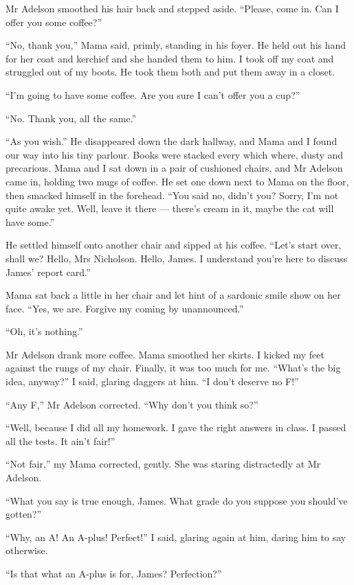 Mr Adelson smoothed his hair back and stepped aside.
``Please, come in. Can I offer you some coffee?''

``No, thank you,'' Mama said, primly, standing in his foyer. He
held out his hand for her coat and kerchief and she handed them to
him. I took off my coat and struggled out of my boots. He took them
both and put them away in a closet.

``I'm going to have some coffee. Are you sure I can't offer you a cup?''

``No. Thank you, all the same.''

``As you wish.'' He disappeared down the dark hallway, and Mama and
I found our way into his tiny parlour. Books were stacked every
which where, dusty and precarious. Mama and I sat down in a pair of
cushioned chairs, and Mr Adelson came in, holding two mugs of
coffee. He set one down next to Mama on the floor, then smacked
himself in the forehead.
``You said no, didn't you? Sorry, I'm not quite awake yet. Well, leave it there 
--- there's cream in it, maybe the cat will have some.''

He settled himself onto another chair and sipped at his coffee.
``Let's start over, shall we? Hello, Mrs Nicholson. Hello, James. I understand 
you're here to discuss James' report card.''

Mama sat back a little in her chair and let hint of a sardonic
smile show on her face.
``Yes, we are. Forgive my coming by unannounced.''

``Oh, it's nothing.''

Mr Adelson drank more coffee. Mama smoothed her skirts. I kicked my
feet against the rungs of my chair. Finally, it was too much for
me. ``What's the big idea, anyway?'' I said, glaring daggers at
him. ``I don't deserve no F!''

``Any F,'' Mr Adelson corrected. ``Why don't you think so?''

``Well, because I did all my homework. I gave the right answers in class. I 
passed all the tests. It ain't fair!''

``Not fair,'' my Mama corrected, gently. She was staring
distractedly at Mr Adelson.

``What you say is true enough, James. What grade do you suppose you should've 
gotten?''

``Why, an A! An A-plus! Perfect!'' I said, glaring again at him,
daring him to say otherwise.

``Is that what an A-plus is for, James? Perfection?''

